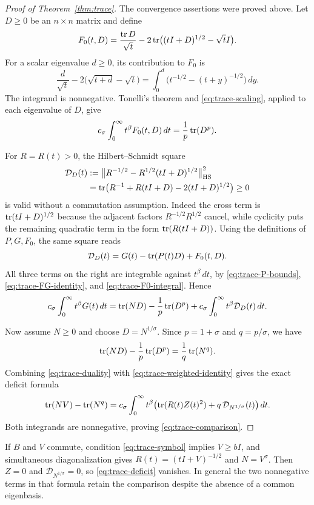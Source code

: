 \begin{proof}[Proof of Theorem~\ref{thm:trace}]
The convergence assertions were proved above.  Let $D\geq0$ be an
$n\times n$ matrix and define
\[
 F_0(t,D)=\frac{\operatorname{tr} D}{\sqrt t}
             -2\operatorname{tr}\bigl((tI+D)^{1/2}-\sqrt t I\bigr).
\]
For a scalar eigenvalue $d\geq0$, its contribution to $F_0$ is
\[
 \frac d{\sqrt t}-2\bigl(\sqrt{t+d}-\sqrt t\bigr)
      =\int_0^d\bigl(t^{-1/2}-(t+y)^{-1/2}\bigr)\,dy.
\]
The integrand is nonnegative.  Tonelli's theorem and
\eqref{eq:trace-scaling}, applied to each eigenvalue of $D$, give
\begin{equation}\label{eq:trace-F0-integral}
 c_\sigma\int_0^\infty t^\beta F_0(t,D)\,dt
                    =\frac1p\operatorname{tr}(D^p).
\end{equation}

For $R=R(t)>0$, the Hilbert--Schmidt square
\begin{align}
 \mathcal D_D(t)
  &:=\bigl\|R^{-1/2}-R^{1/2}(tI+D)^{1/2}\bigr\|_{\mathrm{HS}}^2
       \notag\\
  &=\operatorname{tr}\bigl(R^{-1}+R(tI+D)-2(tI+D)^{1/2}\bigr)\geq0
       \label{eq:trace-square}
\end{align}
is valid without a commutation assumption.  Indeed the cross
term is $\operatorname{tr}(tI+D)^{1/2}$ because the adjacent factors
$R^{-1/2}R^{1/2}$ cancel, while cyclicity puts the remaining
quadratic term in the form $\operatorname{tr}(R(tI+D))$.
Using the definitions of $P,G,F_0$, the same square reads
\[
             \mathcal D_D(t)=G(t)-\operatorname{tr}(P(t)D)+F_0(t,D).
\]
All three terms on the right are integrable against $t^\beta\,dt$,
by \eqref{eq:trace-P-bounds}, \eqref{eq:trace-FG-identity}, and
\eqref{eq:trace-F0-integral}.  Hence
\begin{equation}\label{eq:trace-duality}
 c_\sigma\int_0^\infty t^\beta G(t)\,dt
  =\operatorname{tr}(ND)-\frac1p\operatorname{tr}(D^p)
      +c_\sigma\int_0^\infty t^\beta\mathcal D_D(t)\,dt.
\end{equation}

Now assume $N\geq0$ and choose $D=N^{1/\sigma}$.
Since $p=1+\sigma$ and $q=p/\sigma$, we have
\[
           \operatorname{tr}(ND)-\frac1p\operatorname{tr}(D^p)=\frac1q\operatorname{tr}(N^q).
\]
Combining \eqref{eq:trace-duality} with
\eqref{eq:trace-weighted-identity} gives the exact deficit formula
\begin{equation}\label{eq:trace-deficit}
 \operatorname{tr}(NV)-\operatorname{tr}(N^q)
   =c_\sigma\int_0^\infty t^\beta
       \bigl(\operatorname{tr}(R(t)Z(t)^2)
                 +q\,\mathcal D_{N^{1/\sigma}}(t)\bigr)\,dt.
\end{equation}
Both integrands are nonnegative, proving
\eqref{eq:trace-comparison}.
\end{proof}

\begin{remark}\label{rem:trace-commuting}
If $B$ and $V$ commute, condition \eqref{eq:trace-symbol} implies
$V\geq bI$, and simultaneous diagonalization gives
$R(t)=(tI+V)^{-1/2}$ and $N=V^\sigma$.
Then $Z=0$ and $\mathcal D_{N^{1/\sigma}}=0$, so
\eqref{eq:trace-deficit} vanishes.  In general the two nonnegative
terms in that formula retain the comparison despite the absence
of a common eigenbasis.
\end{remark}
